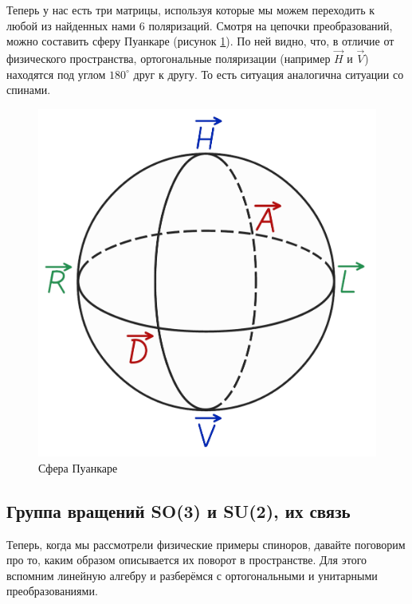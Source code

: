 Теперь у нас есть три матрицы, используя которые мы можем переходить к любой из найденных нами 6 поляризаций. Смотря на цепочки преобразований, можно составить сферу Пуанкаре (рисунок \ref{fig B.6}). По ней видно, что, в отличие от физического пространства, ортогональные поляризации (например $\Vec{H}$ и $\Vec{V}$) находятся под углом $180^{\circ}$ друг к другу. То есть ситуация аналогична ситуации со спинами.
\begin{figure}[h!]
\centering
\includegraphics[scale=0.23]{appendix/images/Poincare sphere.png}
\caption{Сфера Пуанкаре}
\label{fig B.6}
\end{figure}

\subsection{Группа вращений SO(3) и SU(2), их связь}
Теперь, когда мы рассмотрели физические примеры спиноров, давайте поговорим про то, каким образом описывается их поворот в пространстве. Для этого вспомним линейную алгебру и разберёмся с ортогональными и унитарными преобразованиями.

